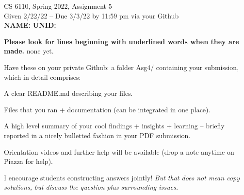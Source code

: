 \documentclass[11pt]{article}
\begin{document}

\newlength{\minpagw}
\settowidth{\minpagw}{\hspace{40em}}

\begin{center}
\begin{large}
  CS 6110, Spring 2022, Assignment 5  \\
  Given 2/22/22 -- Due 3/3/22 by 11:59 pm via your Github 
  \ \\
    {  {\Large\bf NAME: } \hfill {\Large\bf UNID: }\hspace{4cm} }
          \ \\
\end{large}

\end{center}

 {\bf Please look for lines beginning with underlined words when they are made.}
         {\tiny none yet.}

         Have these on your private Github:
         a folder Asg4/ containing your submission, which in detail comprises:
         \begin{compactitem}
         \item A clear README.md describing your files.
         \item Files that you ran + documentation (can be integrated in one place).
         \item A high level summary of your cool findings + insights + learning -- briefly reported in
           a nicely bulletted fashion in your PDF submission.
         \end{compactitem}

Orientation videos and further help will be available (drop a note anytime
on Piazza for help).

I encourage students constructing answers jointly! {\em But that does not
mean copy solutions, but discuss the question plus surrounding issues.}
\end{document}
